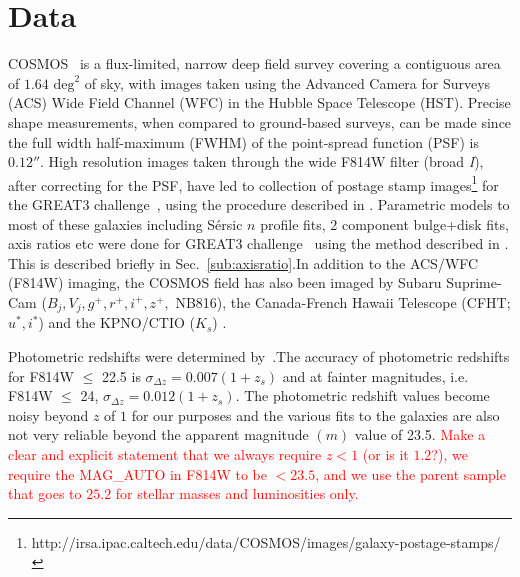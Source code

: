 \documentclass[twocolumn,useAMS,usenatbib]{mn2e}
\newcommand{\rachel}[1]{{\textcolor{red}{#1}}}
\newcommand{\sersicn}{S\'{e}rsic $n$ }
\begin{document}
\section{Data}
\label{S:data}
COSMOS~\citep{COSMOS_overview, COSMOS_generic, COSMOS_Alexie} is a flux-limited, narrow deep field survey covering a contiguous area of $1.64 \text{ deg}^2$ of sky, with images taken using the Advanced Camera for Surveys (ACS) Wide Field Channel (WFC)
in the Hubble Space Telescope (HST). Precise shape measurements, when compared to ground-based surveys, can be made since the full width half-maximum (FWHM) of the point-spread function (PSF)
is $0.12''$. High resolution images taken through the wide F814W filter (broad \emph{I}), after correcting for the PSF, have led to collection of postage stamp images\footnote{http://irsa.ipac.caltech.edu/data/COSMOS/images/galaxy-postage-stamps/} for the GREAT3 challenge~\citep{great3}, using the procedure described in \cite{SHERA}.
Parametric models to most of these galaxies including \sersicn profile fits, 
2 component bulge+disk fits, axis ratios etc were done for GREAT3 challenge~\citep{great3} using the method described in \cite{Claire_Fits}. This is described briefly in Sec.~\ref{sub:axisratio}.In addition to the ACS/WFC (F814W) imaging, the COSMOS field has also been imaged by Subaru Suprime-Cam ($B_j, V_j, g^+,r^+,i^+,z^+,$ NB816), the
Canada-French Hawaii Telescope (CFHT;$u^*,i^*$) and the KPNO/CTIO ($K_s$) .
	      
Photometric redshifts were determined by~\cite{COSMOS_Photoz_30band}.The accuracy of photometric redshifts for F814W $\le$ 22.5 is $\sigma_{\Delta z} = 0.007(1+z_s)$ and at fainter magnitudes, i.e. F814W $\le$ 24, $\sigma_{\Delta z} = 0.012(1+z_s)$.
The photometric redshift values become noisy beyond $z$ of $1$ for our purposes and the various fits to the galaxies are also not very reliable beyond the apparent magnitude $(m)$ value of 23.5. \rachel{Make a clear and explicit statement that we always require $z<1$ (or is it $1.2$?), we require the MAG\_AUTO in F814W to be $<23.5$, and we use the parent sample that goes to $25.2$ for stellar masses and luminosities only.}
\end{document}
